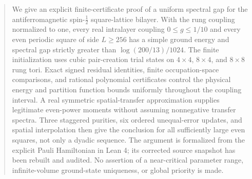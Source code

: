 \begin{abstract}
We give an explicit finite-certificate proof of a uniform spectral gap for the
antiferromagnetic spin-$\tfrac12$ square-lattice bilayer. With the rung coupling
normalized to one, every real intralayer coupling $0\le g\le1/10$ and every even
periodic square of side $L\ge256$ has a simple ground energy and spectral gap
strictly greater than $\log(200/13)/1024$. The finite initialization uses cubic
pair-creation trial states on $4\times4$, $8\times4$, and $8\times8$ rung tori.
Exact signed residual identities, finite occupation-space comparisons, and
rational polynomial certificates control the physical energy and partition
function bounds uniformly throughout the coupling interval. A real symmetric
spatial-transfer approximation supplies legitimate even-power moments without assuming
nonnegative transfer spectra. Three staggered purities, six ordered
unequal-error updates, and spatial interpolation then give the conclusion for
all sufficiently large even squares, not only a dyadic sequence. The argument
is formalized from the explicit Pauli Hamiltonian in Lean 4; its corrected
source snapshot has been rebuilt and audited. No assertion of a near-critical
parameter range, infinite-volume ground-state uniqueness, or global priority
is made.
\end{abstract}
\setcounter{tocdepth}{1}
\tableofcontents
\clearpage
